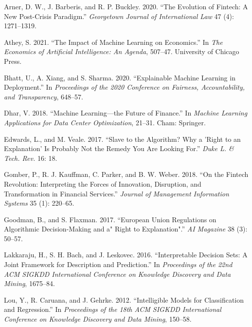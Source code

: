 \documentclass[
  letterpaper,
  DIV=11,
  numbers=noendperiod]{scrartcl}
\newlength{\cslhangindent}
\newlength{\cslentryspacingunit} %
\newenvironment{CSLReferences}[2] %
 {%
  \setlength{\parindent}{0pt}
  \ifodd #1
  \let\oldpar\par
  \def\par{\hangindent=\cslhangindent\oldpar}
  \fi
  \setlength{\parskip}{#2\cslentryspacingunit}
 }%
 {}
\begin{document}
\hypertarget{refs}{}
\begin{CSLReferences}{1}{0}
\leavevmode{}%
Arner, D. W., J. Barberis, and R. P. Buckley. 2020. {``The Evolution of
Fintech: A New Post-Crisis Paradigm.''} \emph{Georgetown Journal of
International Law} 47 (4): 1271--1319.

\leavevmode{}%
Athey, S. 2021. {``The Impact of Machine Learning on Economics.''} In
\emph{The Economics of Artificial Intelligence: An Agenda}, 507--47.
University of Chicago Press.

\leavevmode{}%
Bhatt, U., A. Xiang, and S. Sharma. 2020. {``Explainable Machine
Learning in Deployment.''} In \emph{Proceedings of the 2020 Conference
on Fairness, Accountability, and Transparency}, 648--57.

\leavevmode{}%
Dhar, V. 2018. {``Machine Learning---the Future of Finance.''} In
\emph{Machine Learning Applications for Data Center Optimization},
21--31. Cham: Springer.

\leavevmode{}%
Edwards, L., and M. Veale. 2017. {``Slave to the Algorithm? Why a 'Right
to an Explanation' Is Probably Not the Remedy You Are Looking For.''}
\emph{Duke L. \& Tech. Rev.} 16: 18.

\leavevmode{}%
Gomber, P., R. J. Kauffman, C. Parker, and B. W. Weber. 2018. {``On the
Fintech Revolution: Interpreting the Forces of Innovation, Disruption,
and Transformation in Financial Services.''} \emph{Journal of Management
Information Systems} 35 (1): 220--65.

\leavevmode{}%
Goodman, B., and S. Flaxman. 2017. {``European Union Regulations on
Algorithmic Decision-Making and a" Right to Explanation".''} \emph{AI
Magazine} 38 (3): 50--57.

\leavevmode{}%
Lakkaraju, H., S. H. Bach, and J. Leskovec. 2016. {``Interpretable
Decision Sets: A Joint Framework for Description and Prediction.''} In
\emph{Proceedings of the 22nd ACM SIGKDD International Conference on
Knowledge Discovery and Data Mining}, 1675--84.

\leavevmode{}%
Lou, Y., R. Caruana, and J. Gehrke. 2012. {``Intelligible Models for
Classification and Regression.''} In \emph{Proceedings of the 18th ACM
SIGKDD International Conference on Knowledge Discovery and Data Mining},
150--58.


\end{CSLReferences}
\end{document}
